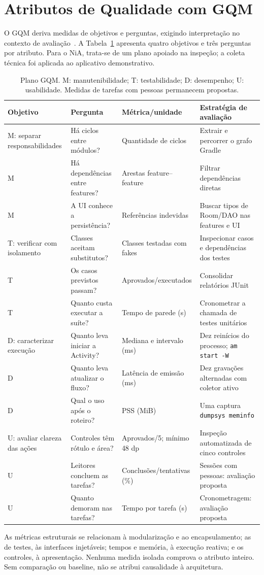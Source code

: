 \section{Atributos de Qualidade com GQM}\label{sec:gqm}
O GQM deriva medidas de objetivos e perguntas, exigindo interpretação no
contexto de avaliação~\cite{basili1994}. A Tabela~\ref{tab:gqm} apresenta quatro
objetivos e três perguntas por atributo. Para o NiA, trata-se de um plano
apoiado na inspeção; a coleta técnica foi aplicada ao aplicativo demonstrativo.

\begin{table}[t]
\caption{Plano GQM. M: manutenibilidade; T: testabilidade; D: desempenho;
U: usabilidade. Medidas de tarefas com pessoas permanecem propostas.}
\label{tab:gqm}
\centering
\begin{tabularx}{\textwidth}{@{}lXXX@{}}
\toprule
Objetivo & Pergunta & Métrica/unidade & Estratégia de avaliação \\
\midrule
M: separar responsabilidades & Há ciclos entre módulos? & Quantidade de ciclos & Extrair e percorrer o grafo Gradle \\
M & Há dependências entre features? & Arestas feature--feature & Filtrar dependências diretas \\
M & A UI conhece a persistência? & Referências indevidas & Buscar tipos de Room/DAO nas features e UI \\
T: verificar com isolamento & Classes aceitam substitutos? & Classes testadas com fakes & Inspecionar casos e dependências dos testes \\
T & Os casos previstos passam? & Aprovados/executados & Consolidar relatórios JUnit \\
T & Quanto custa executar a suíte? & Tempo de parede (s) & Cronometrar a chamada de testes unitários \\
D: caracterizar execução & Quanto leva iniciar a Activity? & Mediana e intervalo (ms) & Dez reinícios do processo; \texttt{am start -W} \\
D & Quanto leva atualizar o fluxo? & Latência de emissão (ms) & Dez gravações alternadas com coletor ativo \\
D & Qual o uso após o roteiro? & PSS (MiB) & Uma captura \texttt{dumpsys meminfo} \\
U: avaliar clareza das ações & Controles têm rótulo e área? & Aprovados/5; mínimo 48 dp & Inspeção automatizada de cinco controles \\
U & Leitores concluem as tarefas? & Conclusões/tentativas (\%) & Sessões com pessoas: avaliação proposta \\
U & Quanto demoram nas tarefas? & Tempo por tarefa (s) & Cronometragem: avaliação proposta \\
\bottomrule
\end{tabularx}
\end{table}

As métricas estruturais se relacionam à modularização e ao encapsulamento; as
de testes, às interfaces injetáveis; tempos e memória, à execução reativa; e
os controles, à apresentação. Nenhuma medida isolada comprova o atributo
inteiro. Sem comparação ou baseline, não se atribui causalidade à arquitetura.
